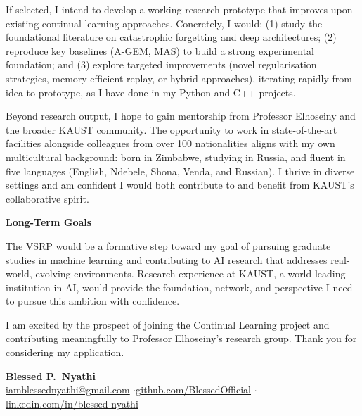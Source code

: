\documentclass[11pt,a4paper]{article}
\begin{document}
If selected, I intend to develop a working research prototype that improves upon existing continual learning approaches. Concretely, I would: (1) study the foundational literature on catastrophic forgetting and deep architectures; (2) reproduce key baselines (A-GEM, MAS) to build a strong experimental foundation; and (3) explore targeted improvements (novel regularisation strategies, memory-efficient replay, or hybrid approaches), iterating rapidly from idea to prototype, as I have done in my Python and C++ projects.

Beyond research output, I hope to gain mentorship from Professor Elhoseiny and the broader KAUST community. The opportunity to work in state-of-the-art facilities alongside colleagues from over 100 nationalities aligns with my own multicultural background: born in Zimbabwe, studying in Russia, and fluent in five languages (English, Ndebele, Shona, Venda, and Russian). I thrive in diverse settings and am confident I would both contribute to and benefit from KAUST's collaborative spirit.

\textbf{\color{NavyBlue}Long-Term Goals}

The VSRP would be a formative step toward my goal of pursuing graduate studies in machine learning and contributing to AI research that addresses real-world, evolving environments. Research experience at KAUST, a world-leading institution in AI, would provide the foundation, network, and perspective I need to pursue this ambition with confidence.

\vspace{0.8em}

I am excited by the prospect of joining the Continual Learning project and contributing meaningfully to Professor Elhoseiny's research group. Thank you for considering my application.

\vspace{1.5em}

\textbf{Blessed P.\ Nyathi}\\
{\small \href{mailto:iamblessednyathi@gmail.com}{iamblessednyathi@gmail.com} \quad$\cdot$\quad \href{https://github.com/BlessedOfficial}{github.com/BlessedOfficial} \quad$\cdot$\quad \href{https://www.linkedin.com/in/blessed-nyathi}{linkedin.com/in/blessed-nyathi}}
\end{document}
